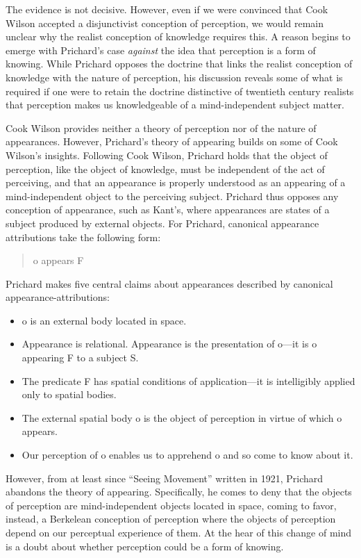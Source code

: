\documentclass[11pt]{article}
\begin{document}
The evidence is not decisive. However, even if we were convinced that Cook Wilson accepted a disjunctivist conception of perception, we would remain unclear why the realist conception of knowledge requires this. A reason begins to emerge with Prichard's case \emph{against} the idea that perception is a form of knowing. While Prichard opposes the doctrine that links the realist conception of knowledge with the nature of perception, his discussion reveals some of what is required if one were to retain the doctrine distinctive of twentieth century realists that perception makes us knowledgeable of a mind-independent subject matter.

Cook Wilson provides neither a theory of perception nor of the nature of appearances. However, Prichard's theory of appearing builds on some of Cook Wilson's insights. Following Cook Wilson, Prichard holds that the object of perception, like the object of knowledge, must be independent of the act of perceiving, and that an appearance is properly understood as an appearing of a mind-independent object to the perceiving subject. Prichard thus opposes any conception of appearance, such as Kant's, where appearances are states of a subject produced by external objects. For Prichard, canonical appearance attributions take the following form:
\begin{quote}
	o appears F
\end{quote}
Prichard makes five central claims about appearances described by canonical appearance-attributions:
\begin{itemize}
	\item o is an external body located in space.
	\item Appearance is relational. Appearance is the presentation of o---it is o appearing F to a subject S.
	\item The predicate F has spatial conditions of application---it is intelligibly applied only to spatial bodies.
	\item The external spatial body o is the object of perception in virtue of which o appears.
	\item Our perception of o enables us to apprehend o and so come to know about it.
\end{itemize}

However, from at least since ``Seeing Movement'' written in 1921, Prichard abandons the theory of appearing. Specifically, he comes to deny that the objects of perception are mind-independent objects located in space, coming to favor, instead, a Berkelean conception of perception where the objects of perception depend on our perceptual experience of them. At the hear of this change of mind is a doubt about whether perception could be a form of knowing.
\end{document}
